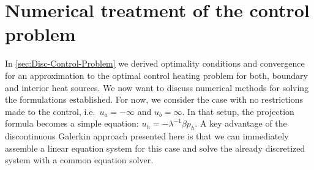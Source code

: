 \documentclass[../thesis.tex]{subfiles}
\begin{document}
\chapter{Numerical treatment of the control problem}
In \cref{sec:Disc-Control-Problem} we derived optimality conditions and convergence for an approximation to the optimal control heating problem for both, boundary and interior heat sources.
We now want to discuss numerical methods for solving the formulations established.
For now, we consider the case with no restrictions made to the control, i.e.\ $u_a = -\infty$ and $u_b = \infty$. In that setup, the projection formula becomes a simple equation: $u_h = - \lambda^{-1} \beta p_h$.
A key advantage of the discontinuous Galerkin approach presented here is that we can immediately assemble a linear equation system for this case and solve the already discretized system with a common equation solver.
\end{document}
